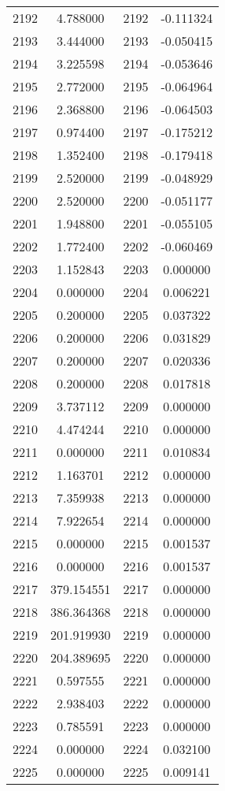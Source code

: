 \documentclass[12pt]{article}
\begin{document}
\begin{longtable}{@{}cccc@{}}
2192 & 4.788000 & 2192 & -0.111324 \\
2193 & 3.444000 & 2193 & -0.050415 \\
2194 & 3.225598 & 2194 & -0.053646 \\
2195 & 2.772000 & 2195 & -0.064964 \\
2196 & 2.368800 & 2196 & -0.064503 \\
2197 & 0.974400 & 2197 & -0.175212 \\
2198 & 1.352400 & 2198 & -0.179418 \\
2199 & 2.520000 & 2199 & -0.048929 \\
2200 & 2.520000 & 2200 & -0.051177 \\
2201 & 1.948800 & 2201 & -0.055105 \\
2202 & 1.772400 & 2202 & -0.060469 \\
2203 & 1.152843 & 2203 & 0.000000 \\
2204 & 0.000000 & 2204 & 0.006221 \\
2205 & 0.200000 & 2205 & 0.037322 \\
2206 & 0.200000 & 2206 & 0.031829 \\
2207 & 0.200000 & 2207 & 0.020336 \\
2208 & 0.200000 & 2208 & 0.017818 \\
2209 & 3.737112 & 2209 & 0.000000 \\
2210 & 4.474244 & 2210 & 0.000000 \\
2211 & 0.000000 & 2211 & 0.010834 \\
2212 & 1.163701 & 2212 & 0.000000 \\
2213 & 7.359938 & 2213 & 0.000000 \\
2214 & 7.922654 & 2214 & 0.000000 \\
2215 & 0.000000 & 2215 & 0.001537 \\
2216 & 0.000000 & 2216 & 0.001537 \\
2217 & 379.154551 & 2217 & 0.000000 \\
2218 & 386.364368 & 2218 & 0.000000 \\
2219 & 201.919930 & 2219 & 0.000000 \\
2220 & 204.389695 & 2220 & 0.000000 \\
2221 & 0.597555 & 2221 & 0.000000 \\
2222 & 2.938403 & 2222 & 0.000000 \\
2223 & 0.785591 & 2223 & 0.000000 \\
2224 & 0.000000 & 2224 & 0.032100 \\
2225 & 0.000000 & 2225 & 0.009141 \\

\end{longtable}
\end{document}
